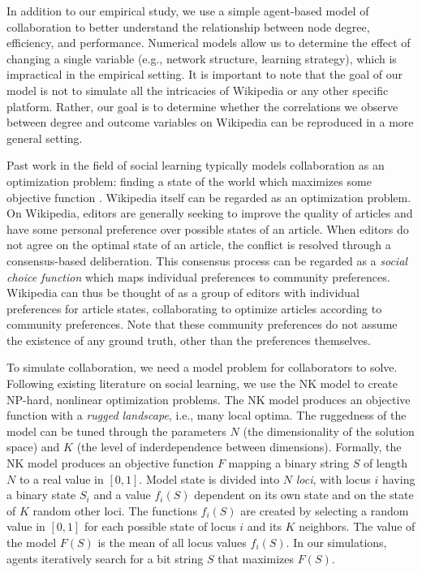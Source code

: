 \documentclass[letterpaper,twocolumn,10pt]{article}
\newcommand{\+}{\phantom{-}}
\begin{document}
In addition to our empirical study,
we use a simple agent-based model of collaboration to better understand
the relationship between node degree, efficiency, and performance.
Numerical models allow us to determine the effect of changing a single
variable (e.g., network structure, learning strategy),
which is impractical in the empirical setting.
It is important to note that the goal of our model is not to simulate
all the intricacies of Wikipedia or any other specific platform.
Rather, our goal is to determine whether the correlations we observe
between degree and outcome variables
on Wikipedia can be reproduced in a more general setting.

Past work in the field of social learning typically models collaboration
as an optimization problem:
finding a state of the world which maximizes some objective function
\cite{lazer_network_2007,mason_propagation_2008,mason_collaborative_2012,barkoczi_social_2016}.
Wikipedia itself can be regarded as an optimization problem.
On Wikipedia, editors are generally seeking to improve the quality of articles
and have some personal preference over possible states of an article.
When editors do not agree on the optimal state of an article,
the conflict is resolved through a consensus-based deliberation.
This consensus process can be regarded as a {\em social choice function}
\cite{arrow_social_2012,brandt_computational_2012}
which maps individual preferences to community preferences.
Wikipedia can thus be thought of as a group of editors with individual preferences
for article states,
collaborating to optimize articles according to community preferences.
Note that these community preferences do not assume the existence of any
ground truth, other than the preferences themselves.

To simulate collaboration, we need a model problem for collaborators to solve.
Following existing literature on social learning,
we use the NK model \cite{kauffman_towards_1987}
to create NP-hard, nonlinear optimization problems.
The NK model produces an objective function with a
{\em rugged landscape}, i.e., many local optima.
The ruggedness of the model can be tuned through the parameters $N$
(the dimensionality of the solution space)
and $K$ (the level of inderdependence between dimensions).
Formally, the NK model produces an objective function $F$ mapping a binary string $S$ of length
$N$ to a real value in $[0,1]$.
Model state is divided into $N$ {\em loci}, with locus $i$ having a binary state $S_i$
and a value $f_i(S)$ dependent on its own state
and on the state of $K$ random other loci.
The functions $f_i(S)$ are created by selecting a random value in $[0,1]$ for
each possible state of locus $i$ and its $K$ neighbors.
The value of the model $F(S)$ is the mean of all locus values $f_i(S)$.
In our simulations,
agents iteratively search for a bit string $S$ that maximizes $F(S)$.
\end{document}
